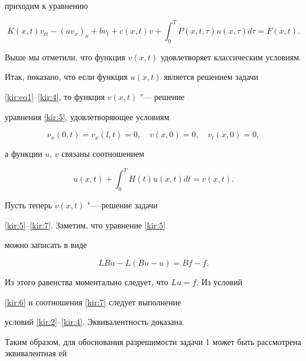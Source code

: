 приходим к уравнению

\begin{equation}

\label{kir:5}

K(x,t)v_{tt}-(av_x)_x+bv_t+c(x,t)v+ \int _0^TP(x,t,\tau)u(x,\tau)d\tau=F(x,t).

\end{equation}

Выше мы отметили, что функция $v(x,t)$ удовлетворяет классическим условиям.



Итак, показано, что если функция $u(x,t)$ является решением задачи

\eqref{kir:eq1}--\eqref{kir:4}, то функция $v(x,t)$ "--- решение

уравнения \eqref{kir:5}, удовлетворяющее условиям

\begin{equation}

\label{kir:6} v_x(0,t)=v_x(l,t)=0, \quad v(x, 0)=0, \quad

v_t(x, 0)=0,

\end{equation}

а функции $u$, $v$ связаны соотношением

\begin{equation}

 \label{kir:7}

u(x,t)+ \int _0^TH(t)u(x,t)dt=v(x,t).

\end{equation}



Пусть теперь $v(x,t)$ "--- решение задачи

\eqref{kir:5}--\eqref{kir:7}. Заметим, что уравнение \eqref{kir:5}

можно записать в виде

$$

LBu-L(Bu-u)=Bf-f.

$$

Из этого равенства моментально следует, что $Lu=f$. Из условий

\eqref{kir:6} и соотношения \eqref{kir:7} следует выполнение

условий \eqref{kir:2}--\eqref{kir:4}. Эквивалентность доказана.



Таким образом, для обоснования разрешимости задачи 1 может быть рассмотрена эквивалентная ей



